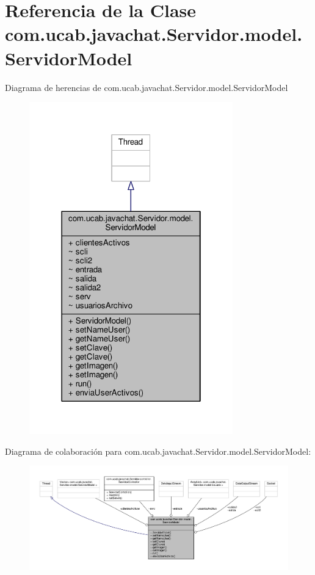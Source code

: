 \hypertarget{classcom_1_1ucab_1_1javachat_1_1_servidor_1_1model_1_1_servidor_model}{\section{Referencia de la Clase com.\-ucab.\-javachat.\-Servidor.\-model.\-Servidor\-Model}
\label{classcom_1_1ucab_1_1javachat_1_1_servidor_1_1model_1_1_servidor_model}
}


Diagrama de herencias de com.\-ucab.\-javachat.\-Servidor.\-model.\-Servidor\-Model\nopagebreak
\begin{figure}[H]
\begin{center}
\leavevmode
\includegraphics[width=250pt]{classcom_1_1ucab_1_1javachat_1_1_servidor_1_1model_1_1_servidor_model__inherit__graph}
\end{center}
\end{figure}


Diagrama de colaboración para com.\-ucab.\-javachat.\-Servidor.\-model.\-Servidor\-Model\-:\nopagebreak
\begin{figure}[H]
\begin{center}
\leavevmode
\includegraphics[width=350pt]{classcom_1_1ucab_1_1javachat_1_1_servidor_1_1model_1_1_servidor_model__coll__graph}
\end{center}
\end{figure}

